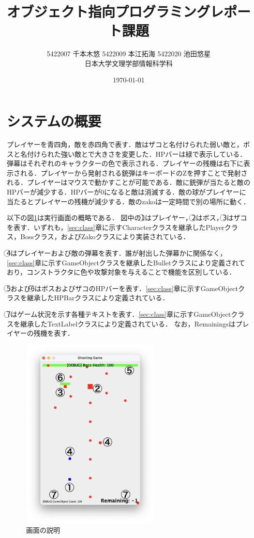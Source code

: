 \documentclass[dvipdfmx]{jlreq}
\title{オブジェクト指向プログラミングレポート課題}
\author{5422007 千本木悠  5422009 本江拓海  5422020 池田悠星\\日本大学文理学部情報科学科}
\date{\today}
\begin{document}
\maketitle

\section{システムの概要}
プレイヤーを青四角，敵を赤四角で表す．敵はザコと名付けられた弱い敵と，ボスと名付けられた強い敵とで大きさを変更した．HPバーは緑で表示している．弾幕はそれぞれのキャラクターの色で表示される．プレイヤーの残機は右下に表示される．プレイヤーから発射される銃弾はキーボードのZを押すことで発射される．プレイヤーはマウスで動かすことが可能である．敵に銃弾が当たると敵のHPバーが減少する．HPバーが0になると敵は消滅する．敵の球がプレイヤーに当たるとプレイヤーの残機が減少する．敵のzakoは一定時間で別の場所に動く．

以下の図\ref{fig:screen}は実行画面の概略である．
図中の\textcircled{\scriptsize 1}はプレイヤー，\textcircled{\scriptsize 2}はボス，\textcircled{\scriptsize 3}はザコを表す．いずれも，\ref{sec:class}章に示すCharacterクラスを継承したPlayerクラス，Bossクラス，およびZakoクラスにより実装されている．

\textcircled{\scriptsize 4}はプレイヤーおよび敵の弾幕を表す．誰が射出した弾幕かに関係なく，\ref{sec:class}章に示すGameObjectクラスを継承したBulletクラスにより定義されており，コンストラクタに色や攻撃対象を与えることで機能を区別している．

\textcircled{\scriptsize 5}および\textcircled{\scriptsize 6}はボスおよびザコのHPバーを表す．\ref{sec:class}章に示すGameObjectクラスを継承したHPBarクラスにより定義されている．

\textcircled{\scriptsize 7}はゲーム状況を示す各種テキストを表す．\ref{sec:class}章に示すGameObjectクラスを継承したTextLabelクラスにより定義されている．
なお，Remainingsはプレイヤーの残機を表す．

\begin{figure}[H]
  \centering
  \includegraphics[width=70mm]{figures/screen.png}
  \caption{画面の説明}
  \label{fig:screen}
\end{figure}
\end{document}
